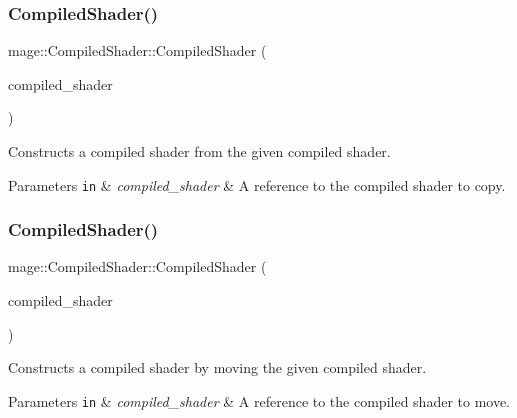 \subsubsection{\texorpdfstring{Compiled\+Shader()}{CompiledShader()}\hspace{0.1cm}{\footnotesize\ttfamily [3/4]}}
{\footnotesize\ttfamily mage\+::\+Compiled\+Shader\+::\+Compiled\+Shader (\begin{DoxyParamCaption}\item[{const \hyperlink{structmage_1_1_compiled_shader}{Compiled\+Shader} \&}]{compiled\+\_\+shader }\end{DoxyParamCaption})\hspace{0.3cm}{\ttfamily [default]}}

Constructs a compiled shader from the given compiled shader.


\begin{DoxyParams}[1]{Parameters}
\mbox{\tt in}  & {\em compiled\+\_\+shader} & A reference to the compiled shader to copy. \\
\hline
\end{DoxyParams}
\hypertarget{structmage_1_1_compiled_shader_a8960c4c808bd170ca00a50c05148ae8c}{}\label{structmage_1_1_compiled_shader_a8960c4c808bd170ca00a50c05148ae8c} 
\subsubsection{\texorpdfstring{Compiled\+Shader()}{CompiledShader()}\hspace{0.1cm}{\footnotesize\ttfamily [4/4]}}
{\footnotesize\ttfamily mage\+::\+Compiled\+Shader\+::\+Compiled\+Shader (\begin{DoxyParamCaption}\item[{\hyperlink{structmage_1_1_compiled_shader}{Compiled\+Shader} \&\&}]{compiled\+\_\+shader }\end{DoxyParamCaption})\hspace{0.3cm}{\ttfamily [default]}}

Constructs a compiled shader by moving the given compiled shader.


\begin{DoxyParams}[1]{Parameters}
\mbox{\tt in}  & {\em compiled\+\_\+shader} & A reference to the compiled shader to move. \\
\hline
\end{DoxyParams}
\hypertarget{structmage_1_1_compiled_shader_a40805ed2bcd988824d130aeb07200f21}{}\label{structmage_1_1_compiled_shader_a40805ed2bcd988824d130aeb07200f21} 

